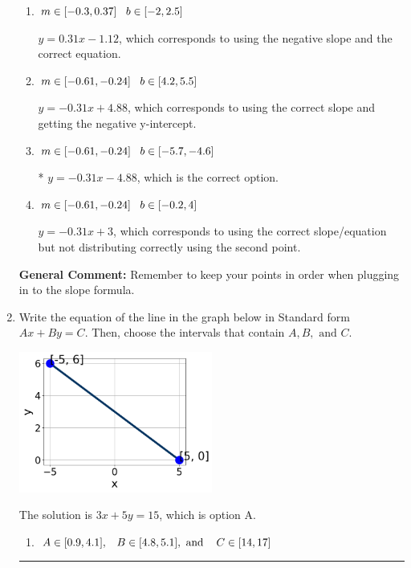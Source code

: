 \documentclass{extbook}[14pt]
\newcommand{\litem}[1]{\item #1

\rule{\textwidth}{0.4pt}}
\begin{document}
\begin{enumerate}
{\begin{enumerate}[label=\Alph*.]
 $y = -0.31x -18$, which corresponds to using the correct slope/equation but not distributing correctly using the first point.
\item \( m \in [-0.3, 0.37] \hspace*{3mm} b \in [-2, 2.5] \)

 $y = 0.31x -1.12$, which corresponds to using the negative slope and the correct equation.
\item \( m \in [-0.61, -0.24] \hspace*{3mm} b \in [4.2, 5.5] \)

 $y = -0.31x + 4.88$, which corresponds to using the correct slope and getting the negative y-intercept.
\item \( m \in [-0.61, -0.24] \hspace*{3mm} b \in [-5.7, -4.6] \)

* $y = -0.31x -4.88$, which is the correct option.
\item \( m \in [-0.61, -0.24] \hspace*{3mm} b \in [-0.2, 4] \)

 $y = -0.31x + 3$, which corresponds to using the correct slope/equation but not distributing correctly using the second point.
\end{enumerate}

\textbf{General Comment:} Remember to keep your points in order when plugging in to the slope formula.
}
\litem{
Write the equation of the line in the graph below in Standard form $Ax+By=C$. Then, choose the intervals that contain $A, B, \text{ and } C$.

\begin{center}
    \includegraphics[width=0.5\textwidth]{../Figures/linearGraphToStandardC.png}
\end{center}



The solution is \( 3x + 5y = 15 \), which is option A.\begin{enumerate}[label=\Alph*.]
\item \( A \in [0.9, 4.1], \hspace{3mm} B \in [4.8, 5.1], \text{ and } \hspace{3mm} C \in [14, 17] \)


\end{enumerate}}
\end{enumerate}
\end{document}
